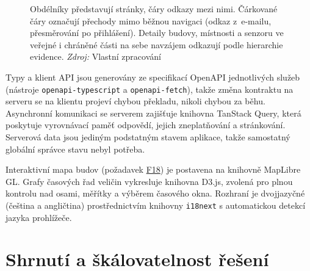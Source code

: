 \begin{figure}[htbp]

\begin{minipage}{0.95\textwidth}
\footnotesize Obdélníky představují stránky, čáry odkazy mezi nimi. Čárkované čáry označují přechody mimo běžnou navigaci (odkaz z~e-mailu, přesměrování po přihlášení). Detaily budovy, místnosti a senzoru ve veřejné i chráněné části na sebe navzájem odkazují podle hierarchie evidence. \textit{Zdroj:} Vlastní zpracování
\end{minipage}
\end{figure}

Typy a klient API jsou generovány ze specifikací OpenAPI jednotlivých služeb (nástroje \texttt{openapi-typescript} a \texttt{openapi-fetch}), takže změna kontraktu na serveru se na klientu projeví chybou překladu, nikoli chybou za běhu. Asynchronní komunikaci se serverem zajišťuje knihovna TanStack Query, která poskytuje vyrovnávací paměť odpovědí, jejich zneplatňování a stránkování. Serverová data jsou jediným podstatným stavem aplikace, takže samostatný globální správce stavu nebyl potřeba.

Interaktivní mapa budov (požadavek \hyperref[tab:funkcni-pozadavky]{F18}) je postavena na knihovně MapLibre GL. Grafy časových řad veličin vykresluje knihovna D3.js, zvolená pro plnou kontrolu nad osami, měřítky a výběrem časového okna. Rozhraní je dvojjazyčné (čeština a angličtina) prostřednictvím knihovny \texttt{i18next} s automatickou detekcí jazyka prohlížeče.

\section{Shrnutí a škálovatelnost řešení}

